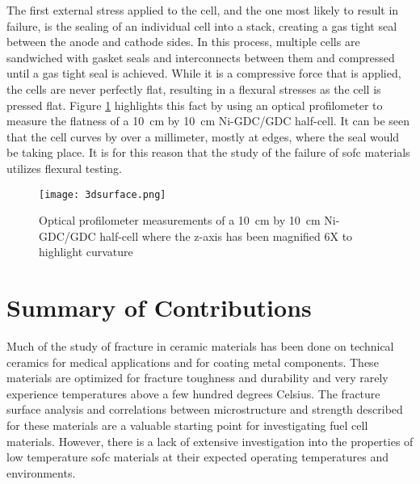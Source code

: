     The first external stress applied to the cell, and the one most likely to result in failure, is the  sealing of an individual cell into a stack, creating a gas tight seal between the anode and cathode sides.
    In this process, multiple cells are sandwiched with gasket seals and interconnects between them and compressed until a gas tight seal is achieved.
    While it is a compressive force that is applied, the cells are never perfectly flat, resulting in a flexural stresses as the cell is pressed flat.
    Figure \ref{fig:flatness} highlights this fact by using an optical profilometer to measure the flatness of a \SI{10}{\centi\meter} by \SI{10}{\centi\meter} Ni-GDC/GDC half-cell.
    It can be seen that the cell curves by over a millimeter, mostly at edges, where the seal would be taking place.
    It is for this reason that the study of the failure of \gls{sofc} materials utilizes flexural testing.

    \begin{figure}[p]
      \centering
      \texttt{[image: 3dsurface.png]}
      \caption{Optical profilometer measurements of a \SI{10}{\centi\meter} by \SI{10}{\centi\meter} Ni-GDC/GDC half-cell where the z-axis has been magnified 6X to highlight curvature}\label{fig:flatness}
    \end{figure}

\section{Summary of Contributions}%
    Much of the study of fracture in ceramic materials has been done on technical ceramics for medical applications and for coating metal components.\cite{Deng2004,Ambrozic2007,Yonezu2014,Meille2012,Nie2010,Olagnon1999,Sorensen2001,Barinov1997}
    These materials are optimized for fracture toughness and durability and very rarely experience temperatures above a few hundred degrees Celsius.
    The fracture surface analysis and correlations between microstructure and strength described for these materials are a valuable starting point for investigating fuel cell materials.
    However, there is a lack of extensive investigation into the properties of low temperature \gls{sofc} materials at their expected operating temperatures and environments.

